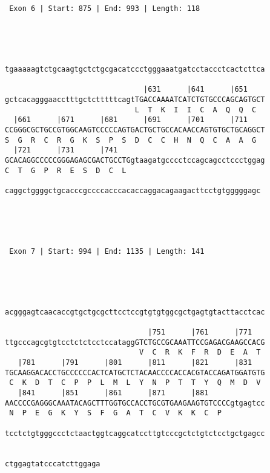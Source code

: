 \documentclass{article}
\begin{document}
\begin{Verbatim}
 Exon 6 | Start: 875 | End: 993 | Length: 118 




                                                            
tgaaaaagtctgcaagtgctctgcgacatccctgggaaatgatcctaccctcactcttca
                                                            
                                |631      |641      |651    
gctcacagggaacctttgctctttttcagtTGACCAAAATCATCTGTGCCCAGCAGTGCT
                              L  T  K  I  I  C  A  Q  Q  C  
  |661      |671      |681      |691      |701      |711    
CCGGGCGCTGCCGTGGCAAGTCCCCCAGTGACTGCTGCCACAACCAGTGTGCTGCAGGCT
S  G  R  C  R  G  K  S  P  S  D  C  C  H  N  Q  C  A  A  G  
  |721      |731      |741                                  
GCACAGGCCCCCGGGAGAGCGACTGCCTGgtaagatgcccctccagcagcctccctggag
C  T  G  P  R  E  S  D  C  L                                
                                                           
caggctggggctgcacccgccccacccacaccaggacagaagacttcctgtgggggagc
                                                           




 Exon 7 | Start: 994 | End: 1135 | Length: 141 




                                                            
acgggagtcaacaccgtgctgcgcttcctccgtgtgtggcgctgagtgtacttacctcac
                                                            
                                 |751      |761      |771   
ttgcccagcgtgtcctctctcctccataggGTCTGCCGCAAATTCCGAGACGAAGCCACG
                               V  C  R  K  F  R  D  E  A  T 
   |781      |791      |801      |811      |821      |831   
TGCAAGGACACCTGCCCCCCACTCATGCTCTACAACCCCACCACGTACCAGATGGATGTG
 C  K  D  T  C  P  P  L  M  L  Y  N  P  T  T  Y  Q  M  D  V 
   |841      |851      |861      |871      |881             
AACCCCGAGGGCAAATACAGCTTTGGTGCCACCTGCGTGAAGAAGTGTCCCCgtgagtcc
 N  P  E  G  K  Y  S  F  G  A  T  C  V  K  K  C  P          
                                                            
tcctctgtgggccctctaactggtcaggcatccttgtcccgctctgtctcctgctgagcc
                                                            
                      
ctggagtatcccatcttggaga
                      





\end{Verbatim}
\end{document}
